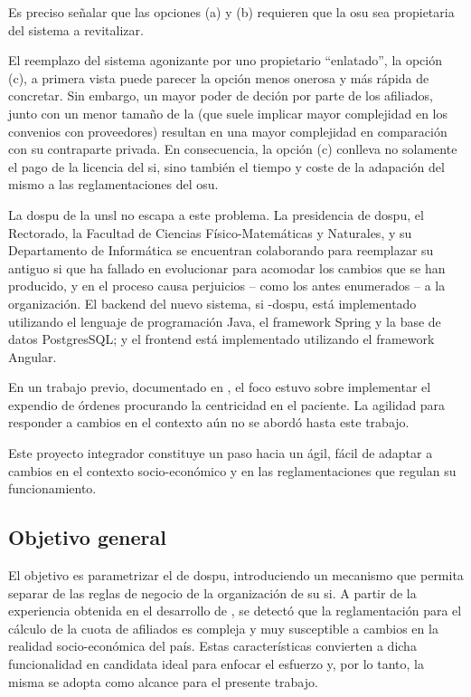 Es preciso señalar que las opciones (a) y (b) requieren que la \acrshort{osu} sea propietaria del sistema a revitalizar.

El reemplazo del sistema agonizante por uno propietario ``enlatado'', la opción (c), a primera vista puede parecer la opción menos onerosa y más rápida de concretar. 
Sin embargo, un mayor poder de deción por parte de los afiliados, junto con un menor tamaño de la  (que suele implicar mayor complejidad en los convenios con proveedores) resultan en una mayor complejidad en comparación con su contraparte privada. En consecuencia, la opción (c) conlleva no solamente el pago de la licencia del \acrshort{si}, sino también el tiempo y coste de la adapación del mismo a las reglamentaciones del \acrshort{osu}.

La \acrfull{dospu} de la \acrfull{unsl} no escapa a este problema. 
La presidencia de \acrshort{dospu}, el Rectorado, la Facultad de Ciencias Físico-Matemáticas y Naturales, y su Departamento de Informática se encuentran colaborando para reemplazar su antiguo \acrshort{si} que ha fallado en evolucionar para acomodar los cambios que se han producido, y en el proceso causa perjuicios – como los antes enumerados – a la organización. 
%
El backend del nuevo sistema, \acrshort{si} -\acrshort{dospu}, está implementado utilizando el lenguaje de programación Java, el framework Spring y la base de datos PostgresSQL; y el frontend está implementado utilizando el framework Angular. 

En un trabajo previo, documentado en \cite{Vela2024}, el foco estuvo sobre implementar el expendio de órdenes procurando la centricidad en el paciente.
La agilidad para responder a cambios en el contexto aún no se abordó hasta este trabajo.

Este proyecto integrador constituye un paso hacia un {\SIOSU} ágil, fácil de adaptar a cambios en el contexto socio-económico y en las reglamentaciones que regulan su funcionamiento.

\subsection{Objetivo general}

El objetivo es parametrizar el {\SIOSU} de \acrshort{dospu}, introduciendo un mecanismo que permita separar de las reglas de negocio de la organización de su \acrshort{si}. 
A partir de la experiencia obtenida en el desarrollo de {\SIDOSPU}, se detectó que la reglamentación para el cálculo de la cuota de afiliados es compleja y muy susceptible a cambios en la realidad socio-económica del país. 
Estas características convierten a dicha funcionalidad en candidata ideal para enfocar el esfuerzo y, por lo tanto, la misma se adopta como alcance para el presente trabajo.

